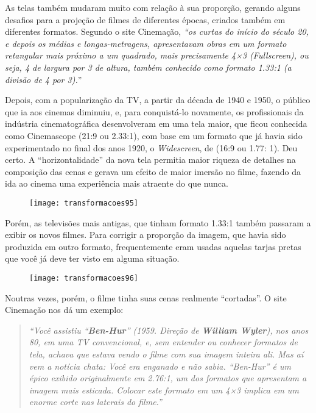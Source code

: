 As telas também mudaram muito com relação à sua proporção, gerando alguns desafios para a projeção de filmes de diferentes épocas, criados também em diferentes formatos. Segundo o site Cinemação, \textit{“os curtas do início do século 20, e depois os médias e longas-metragens, apresentavam obras em um formato retangular mais próximo a um quadrado, mais precisamente 4×3 (Fullscreen), ou seja, 4 de largura por 3 de altura, também conhecido como formato 1.33:1 (a divisão de 4 por 3).}”

Depois, com a popularização da TV, a partir da década de 1940 e 1950, o público que ia aos cinemas diminuiu, e, para conquistá-lo novamente, os profissionais da indústria cinematográfica desenvolveram em uma tela maior, que ficou conhecida como Cinemascope (21:9 ou 2.33:1), com base em um formato que já havia sido experimentado no final dos anos 1920, o \textit{Widescreen}, de (16:9 ou 1.77: 1). Deu certo. A “horizontalidade” da nova tela permitia maior riqueza de detalhes na composição das cenas e gerava um efeito de maior imersão no filme, fazendo da ida ao cinema uma experiência mais atraente do que nunca. 

\begin{figure}[H]
\centering

\texttt{[image: transformacoes95]}
\end{figure}

Porém, as televisões mais antigas, que tinham formato 1.33:1 também passaram a exibir os novos filmes. Para corrigir a proporção da imagem, que havia sido produzida em outro formato, frequentemente eram usadas aquelas tarjas pretas que você já deve ter visto em alguma situação.

\begin{figure}[H]
\centering

\texttt{[image: transformacoes96]}
\end{figure}

Noutras vezes, porém, o filme tinha suas cenas realmente “cortadas”.  O site Cinemação nos dá um exemplo: 

\begin{quote}
\textit{
	“Você assistiu “\textbf{Ben-Hur}” (1959. Direção de \textbf{William Wyler}), nos anos 80, em uma TV convencional, e, sem entender ou conhecer formatos de tela, achava que estava vendo o filme com sua imagem inteira ali. Mas aí vem a notícia chata: Você era enganado e não sabia. “Ben-Hur” é um épico exibido originalmente em 2.76:1, um dos formatos que apresentam a imagem mais esticada. Colocar este formato em um 4×3 implica em um enorme corte nas laterais do filme.”
}
\end{quote}

